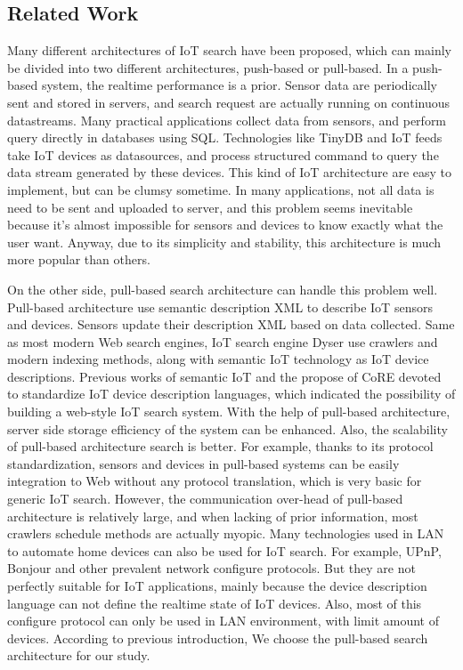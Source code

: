 \documentclass[conference]{IEEEtran}
\begin{document}
\subsection{Related Work}

Many different architectures of IoT search have been proposed, which can mainly be divided into two different architectures, push-based or pull-based.
In a push-based system, the realtime performance is a prior. Sensor data are periodically sent and stored in servers, and search request are actually running on continuous datastreams. Many practical applications collect data from sensors, and perform query directly in databases using SQL. Technologies like TinyDB\cite{TinyDB} and IoT feeds\cite{Whitehouse2006} take IoT devices as datasources, and process structured command to query the data stream generated by these devices. This kind of IoT architecture are easy to implement, but can be clumsy sometime. In many applications, not all data is need to be sent and uploaded to server, and this problem seems inevitable because it's almost impossible for sensors and devices to know exactly what the user want. Anyway, due to its simplicity and stability, this architecture is much more popular than others.


On the other side, pull-based search architecture can handle this problem well. Pull-based architecture use semantic description XML to describe IoT sensors and devices. Sensors update their description XML based on data collected. Same as most modern Web search engines, IoT search engine Dyser\cite{Dyser} use crawlers and modern indexing methods, along with semantic IoT technology as IoT device descriptions. Previous works of semantic IoT\cite{Compton2012} and the propose of CoRE\cite{CoREWorkingGroup2012} devoted to standardize IoT device description languages, which indicated the possibility of building a web-style IoT search system. 
With the help of pull-based architecture, server side storage efficiency of the system can be enhanced. Also, the scalability of pull-based architecture search is better. For example, thanks to its protocol standardization, sensors and devices in pull-based systems can be easily integration to Web without any protocol translation, which is very basic for generic IoT search. However, the communication over-head of pull-based architecture is relatively large, and when lacking of prior information, most crawlers schedule methods are actually myopic.
Many technologies used in LAN to automate home devices can also be used for IoT search. For example, UPnP\cite{UPnP}, Bonjour\cite{Bonjour} and other prevalent network configure protocols. But they are not perfectly suitable for IoT applications, mainly because the device description language can not define the realtime state of IoT devices. Also, most of this configure protocol can only be used in LAN environment, with limit amount of devices.
According to previous introduction, We choose the pull-based search architecture for our study. 
\end{document}
